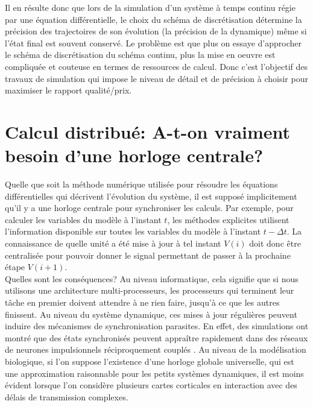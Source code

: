 Il en résulte donc que lors de la simulation d'un système à temps continu régie par une équation différentielle, le choix du schéma de discrétisation détermine la précision des trajectoires de son évolution (la précision de la dynamique) même si l'état final est souvent conservé. Le problème est que plus on essaye d'approcher le schéma de discrétisation du schéma continu, plus la mise en oeuvre est compliquée et couteuse en termes de ressources de calcul. Donc c'est l'objectif des travaux de simulation qui impose le niveau de détail et de précision à choisir pour maximiser le rapport qualité/prix.

\section{Calcul distribué: A-t-on vraiment besoin d'une horloge centrale?}

Quelle que soit la méthode numérique utilisée pour résoudre les équations différentielles qui décrivent l'évolution du système, il est supposé implicitement qu'il y a une horloge centrale pour synchroniser les calculs. Par exemple, pour calculer les variables du modèle à l'instant $t$, les méthodes explicites utilisent l'information disponible sur toutes les variables du modèle à l'instant $t-\Delta t$. La connaissance de quelle unité a été mise à jour à tel instant $V(i)$ doit donc être centralisée pour pouvoir donner le signal permettant de passer à la prochaine étape $V(i+1)$.\\

Quelles sont les conséquences? Au niveau informatique, cela signifie que si nous utilisons une architecture multi-processeurs, les processeurs qui terminent leur tâche en premier doivent attendre à ne rien faire, jusqu'à ce que les autres finissent. Au niveau du système dynamique, ces mises à jour régulières peuvent induire des mécanismes de synchronisation parasites. En effet, des simulations ont montré que des états synchronisés peuvent appraître rapidement dans des réseaux de neurones impulsionnels réciproquement couplés \cite{Hopfield:1995}. Au niveau de la modélisation biologique, si l'on suppose l'existence d'une horloge globale universelle, qui est une approximation raisonnable pour les petits systèmes dynamiques, il est moins évident lorsque l'on considère plusieurs cartes corticales en interaction avec des délais de transmission complexes.\\

